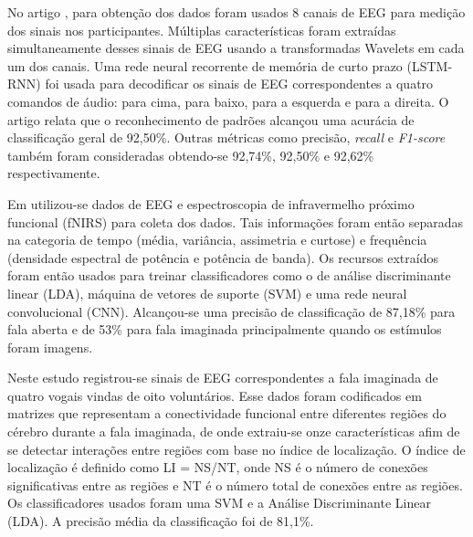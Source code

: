 \documentclass[a4paper,12pt,openright,oneside]{book}
\newenvironment{myenv}[1]
  {\begin{spacing}{#1}}
  {\end{spacing}}
\begin{document}
\begin{myenv}{1.5}
				\par No artigo \cite{pawar2022wavelet}, para obtenção dos dados foram usados 8 canais de EEG para medição dos sinais nos participantes. Múltiplas características foram extraídas simultaneamente desses sinais de EEG usando a transformadas Wavelets em cada um dos canais. Uma rede neural recorrente de memória de curto prazo (LSTM-RNN) foi usada para decodificar os sinais de EEG correspondentes a quatro comandos de áudio: para cima, para baixo, para a esquerda e para a direita. O artigo relata que o reconhecimento de padrões alcançou uma acurácia de classificação geral de 92,50\%. Outras métricas como precisão, \textit{recall} e \textit{F1-score} também foram consideradas obtendo-se 92,74\%, 92,50\% e 92,62\% respectivamente.\newline
				
				\par Em \cite{cooney2021bimodal} utilizou-se dados de EEG e espectroscopia de infravermelho próximo funcional (fNIRS) para coleta dos dados. Tais informações foram então separadas na categoria de tempo (média, variância, assimetria e curtose) e frequência (densidade espectral de potência e potência de banda). Os recursos extraídos foram então usados para treinar classificadores como o de análise discriminante linear (LDA), máquina de vetores de suporte (SVM) e uma rede neural convolucional (CNN). Alcançou-se uma precisão de classificação de 87,18\% para fala aberta e de 53\% para fala imaginada principalmente quando os estímulos foram imagens.\newline
				
				\par Neste estudo \cite{bakhshali2022investigating} registrou-se sinais de EEG correspondentes a fala imaginada de quatro vogais vindas de oito voluntários. Esse dados foram codificados em matrizes que representam a conectividade funcional entre diferentes regiões do cérebro durante a fala imaginada, de onde extraiu-se onze características afim de se detectar interações entre regiões com base no índice de localização. O índice de localização é definido como LI = NS/NT, onde NS é o número de conexões significativas entre as regiões e NT é o número total de conexões entre as regiões. Os classificadores usados foram uma SVM e a Análise Discriminante Linear (LDA). A precisão média da classificação foi de 81,1\%.\newline
				

\end{myenv}
\end{document}
